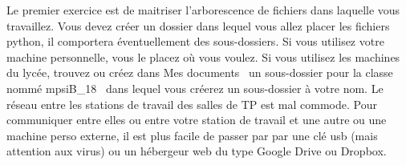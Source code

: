 Le premier exercice est de maitriser l'arborescence de fichiers dans laquelle vous travaillez. Vous devez créer un dossier dans lequel vous allez placer les fichiers python, il comportera éventuellement des sous-dossiers. \newline
Si vous utilisez votre machine personnelle, vous le placez où vous voulez. Si vous utilisez les machines du lycée, trouvez ou créez dans \og Mes documents\fg~ un sous-dossier pour la classe nommé \og mpsiB\_18\fg~ dans lequel vous créerez un sous-dossier à votre nom.\newline
Le réseau entre les stations de travail des salles de TP est mal commode. Pour communiquer entre elles ou entre votre station de travail et une autre ou une machine perso externe, il est plus facile de passer par par une clé usb (mais attention aux virus) ou un hébergeur web du type Google Drive ou Dropbox.